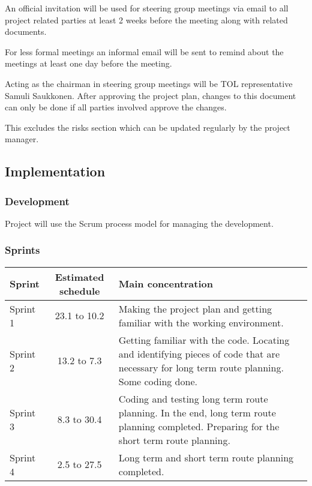 \documentclass[12pt,titlepage,a4paper]{article}
\begin{document}
		An official invitation will be used for steering group meetings via email to all project related parties at least 2 weeks 			before the meeting along with related documents.
 
		For less formal meetings an informal email will be sent to remind about the meetings at least one day before the 				meeting.

		Acting as the chairman in steering group meetings will be TOL representative Samuli Saukkonen.
		After approving the project plan, changes to this document can only be done if all parties involved approve the 				changes.
	
		This excludes the risks section which can be updated regularly by the project manager.
 
	\subsection{Implementation}
 
			\subsubsection{Development}
 
				Project will use the Scrum process model for managing the development.
 
			\subsubsection{Sprints}

			\begin{center}
			\begin{tabular}{|l|c|p{7 cm}|}
				\hline
				\textbf{Sprint} & \textbf{Estimated schedule} & \textbf{Main concentration} \\ \hline
				\hline
				Sprint 1 & 23.1 to 10.2 & Making the project plan and getting familiar with the working environment. \\ \hline
				Sprint 2 & 13.2 to 7.3 & Getting familiar with the code. Locating and identifying pieces of code 								that are necessary for long term route planning. Some coding done. \\ \hline
				Sprint 3 & 8.3 to 30.4 & Coding and testing long term route planning. In the end, long term route planning 						completed. Preparing for the short term route planning.\\ \hline
				Sprint 4 & 2.5 to 27.5 & Long term and short term route planning completed.\\ \hline
			\end{tabular}
			\end{center}
\end{document}
